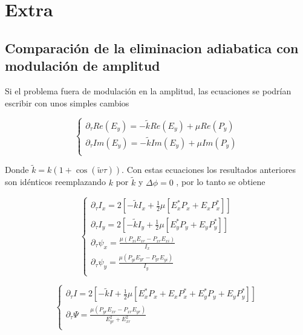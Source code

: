\chapter{Extra}


		
		\section{Comparación de la eliminacion adiabatica con modulación de amplitud}
		
		
		
		Si el problema fuera de modulación en la amplitud, las ecuaciones se podrían escribir con unos simples cambios
		
		\[
			\begin{cases}
				\partial_{\tau} Re(E_y)=-\tilde{k} Re(E_y) + \mu Re(P_y) \\
				\partial_{\tau} Im(E_y)=-\tilde{k} Im(E_y) + \mu Im(P_y)  \\
			\end{cases}
		\]
		 
		Donde $\tilde{k}=k(1+\cos(\tilde{w} \tau))$. Con estas ecuaciones los resultados anteriores son idénticos reemplazando $k$ por $\tilde{k}$ y $\Delta \phi =0$ , por lo tanto se obtiene		
		
		
			\begin{equation}
				\begin{cases}
					\partial_{\tau}I_x=2[-\tilde{k} I_x +\tfrac{1}{2}\mu[E^*_xP_x+E_xP^*_x] ]  \\
					\partial_{\tau}I_y=2[-\tilde{k} I_y +\tfrac{1}{2}\mu[E^*_yP_y+E_yP^*_y] ]  \\
					\partial_{\tau}\psi_x  = \frac{\mu(P_{xi}E_{xr}-P_{xr}E_{xi})}{I_x}\\
					\partial_{\tau}\psi_y  = \frac{\mu(P_{yi}E_{yr}-P_{yr}E_{yi})}{I_y}\\
				\end{cases}	
			\end{equation}
			
			
			
			\begin{equation}
				\begin{cases}
					\partial_{\tau}I=2[-\tilde{k} I +\tfrac{1}{2}\mu[E^*_xP_x+E_xP^*_x+E^*_yP_y+E_yP^*_y]  ] \\
					\partial_{\tau}\Psi  = \frac{\mu(P_{yr}E_{xr}-P_{xr}E_{yr})}{E^2_{yr}+E^2_{xr}}\\
				\end{cases}
			\end{equation}
			
